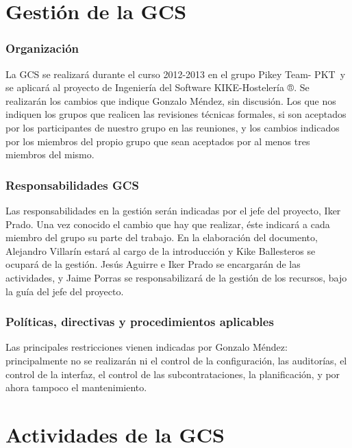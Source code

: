\documentclass[spanish,a4paper,11pt, twoside]{report}	%
\newcommand*{\PKT}{\hbox{P}\kern-2.5pt\lower3.5pt\hbox{\small{K}}\kern-2.8pt\hbox{T}\kern-2pt}	%
\begin{document}
\setcounter{section}{0}

\part{Gestión de la GCS }
	\section{Organización}
	La GCS se realizará durante el curso 2012-2013 en el grupo Pikey Team- \PKT \  y se aplicará al proyecto de Ingeniería del Software KIKE-Hostelería ®. Se realizarán  los cambios que indique Gonzalo Méndez, sin discusión. Los que nos indiquen
	los grupos que realicen las revisiones técnicas formales, si son aceptados por los participantes de nuestro grupo en las reuniones, y los cambios indicados por los miembros del propio grupo que sean aceptados por al menos tres miembros del mismo.
	\section{Responsabilidades GCS}
	Las responsabilidades en la gestión serán indicadas por el jefe del proyecto, Iker Prado. Una vez conocido el cambio que hay que realizar, éste indicará a cada miembro del grupo su parte del trabajo. En la elaboración del documento,
	Alejandro Villarín estará al cargo de la introducción y  Kike Ballesteros se ocupará de la gestión. Jesús Aguirre e Iker Prado se encargarán de las actividades,  y Jaime Porras se responsabilizará de la gestión de los recursos, bajo la guía del jefe del proyecto.
	\section{Políticas, directivas y procedimientos aplicables}
	Las principales restricciones vienen indicadas por Gonzalo Méndez: principalmente no se realizarán ni el control de la configuración, las auditorías, el control de la interfaz, el control de las subcontrataciones, la planificación, y por ahora 
	tampoco el mantenimiento.


\setcounter{section}{0}

\part{Actividades de la GCS}
\end{document}
